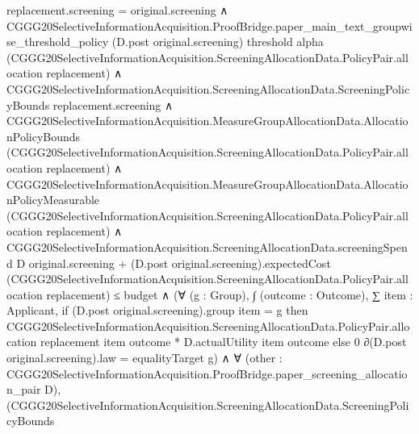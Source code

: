 \documentclass[10pt]{article}
\begin{document}
\begin{ReviewVerbatim}
                    replacement.screening = original.screening ∧
                      CGGG20SelectiveInformationAcquisition.ProofBridge.paper_main_text_groupwise_threshold_policy
                          (D.post original.screening) threshold alpha
                          (CGGG20SelectiveInformationAcquisition.ScreeningAllocationData.PolicyPair.allocation
                            replacement) ∧
                        CGGG20SelectiveInformationAcquisition.ScreeningAllocationData.ScreeningPolicyBounds
                            replacement.screening ∧
                          CGGG20SelectiveInformationAcquisition.MeasureGroupAllocationData.AllocationPolicyBounds
                              (CGGG20SelectiveInformationAcquisition.ScreeningAllocationData.PolicyPair.allocation
                                replacement) ∧
                            CGGG20SelectiveInformationAcquisition.MeasureGroupAllocationData.AllocationPolicyMeasurable
                                (CGGG20SelectiveInformationAcquisition.ScreeningAllocationData.PolicyPair.allocation
                                  replacement) ∧
                              CGGG20SelectiveInformationAcquisition.ScreeningAllocationData.screeningSpend D
                                      original.screening +
                                    (D.post original.screening).expectedCost
                                      (CGGG20SelectiveInformationAcquisition.ScreeningAllocationData.PolicyPair.allocation
                                        replacement) ≤
                                  budget ∧
                                (∀ (g : Group),
                                    ∫ (outcome : Outcome),
                                        ∑ item : Applicant,
                                          if (D.post original.screening).group item = g then
                                            CGGG20SelectiveInformationAcquisition.ScreeningAllocationData.PolicyPair.allocation
                                                replacement item outcome *
                                              D.actualUtility item outcome
                                          else 0 ∂(D.post original.screening).law =
                                      equalityTarget g) ∧
                                  ∀
                                    (other :
                                      CGGG20SelectiveInformationAcquisition.ProofBridge.paper_screening_allocation_pair
                                        D),
                                    (CGGG20SelectiveInformationAcquisition.ScreeningAllocationData.ScreeningPolicyBounds

\end{ReviewVerbatim}
\end{document}
